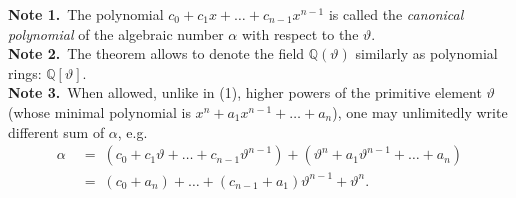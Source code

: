 \documentclass[12pt]{article}
\theoremstyle{definition}
\begin{document}
\textbf{Note 1.}\, The polynomial $c_0+c_1x+\ldots+c_{n-1}x^{n-1}$ is called the \emph{canonical polynomial} of the algebraic number $\alpha$ with respect to the  $\vartheta$. \\

\textbf{Note 2.}\, The theorem allows to denote the field $\mathbb{Q}(\vartheta)$ similarly as polynomial rings: 
$\mathbb{Q}[\vartheta]$. \\

\textbf{Note 3.}\, When allowed, unlike in (1), higher powers of the primitive element $\vartheta$ (whose minimal polynomial is $x^n+a_1x^{n-1}+\ldots+a_n$), one may unlimitedly write different sum  of $\alpha$, e.g.
\begin{align*}
\alpha & \;=\; (c_0+c_1\vartheta+\ldots+c_{n-1}\vartheta^{n-1})
+(\vartheta^n+a_1\vartheta^{n-1}+\ldots+a_n) \\
       &\;=\; (c_0\!+\!a_n)+\ldots+(c_{n-1}\!+\!a_1)\vartheta^{n-1}+\vartheta^n.
\end{align*}




\end{document}
